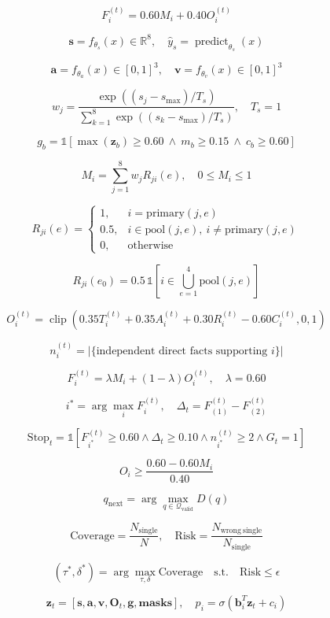 \documentclass{article}
\begin{document}
\[
F_i^{(t)}=0.60M_i+0.40O_i^{(t)}
\]

\[
\mathbf{s}=f_{\theta_s}(x)\in\mathbb{R}^{8},\quad \hat{y}_{s}=\operatorname{predict}_{\theta_s}(x)
\]

\[
\mathbf{a}=f_{\theta_a}(x)\in[0,1]^3,\quad \mathbf{v}=f_{\theta_v}(x)\in[0,1]^3
\]

\[
w_j=\frac{\exp((s_j-s_{\max})/T_s)}{\sum_{k=1}^{8}\exp((s_k-s_{\max})/T_s)},\quad T_s=1
\]

\[
g_b=\mathbb{1}[\max(\mathbf{z}_b)\geq0.60\ \land\ m_b\geq0.15\ \land\ c_b\geq0.60]
\]

\[
M_i=\sum_{j=1}^{8}w_jR_{ji}(e),\quad 0\leq M_i\leq1
\]

\[
R_{ji}(e)=\left\{\begin{array}{ll}1,&i=\mathrm{primary}(j,e)\\0.5,&i\in\mathrm{pool}(j,e),\ i\ne\mathrm{primary}(j,e)\\0,&\mathrm{otherwise}\end{array}\right.
\]

\[
R_{ji}(e_0)=0.5\,\mathbb{1}[i\in\bigcup_{e=1}^{4}\mathrm{pool}(j,e)]
\]

\[
O_i^{(t)}=\operatorname{clip}(0.35T_i^{(t)}+0.35A_i^{(t)}+0.30R_i^{(t)}-0.60C_i^{(t)},0,1)
\]

\[
n_i^{(t)}=\left|\{\text{independent direct facts supporting }i\}\right|
\]

\[
F_i^{(t)}=\lambda M_i+(1-\lambda)O_i^{(t)},\quad\lambda=0.60
\]

\[
i^*=\arg\max_i F_i^{(t)},\quad\Delta_t=F_{(1)}^{(t)}-F_{(2)}^{(t)}
\]

\[
\mathrm{Stop}_t=\mathbb{1}[F_{i^*}^{(t)}\geq0.60\land\Delta_t\geq0.10\land n_{i^*}^{(t)}\geq2\land G_t=1]
\]

\[
O_i\geq\frac{0.60-0.60M_i}{0.40}
\]

\[
q_{\mathrm{next}}=\arg\max_{q\in\mathcal{Q}_{\mathrm{valid}}}D(q)
\]

\[
\mathrm{Coverage}=\frac{N_{\mathrm{single}}}{N},\quad \mathrm{Risk}=\frac{N_{\mathrm{wrong\ single}}}{N_{\mathrm{single}}}
\]

\[
(\tau^*,\delta^*)=\arg\max_{\tau,\delta}\mathrm{Coverage}\quad\mathrm{s.t.}\quad\mathrm{Risk}\leq\epsilon
\]

\[
\mathbf{z}_t=[\mathbf{s},\mathbf{a},\mathbf{v},\mathbf{O}_t,\mathbf{g},\mathbf{masks}],\quad p_i=\sigma(\mathbf{b}_i^T\mathbf{z}_t+c_i)
\]
\end{document}
